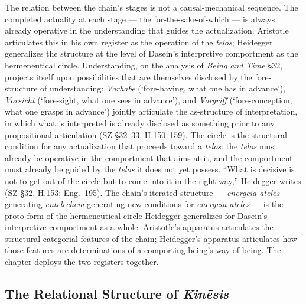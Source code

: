 The relation between the chain's stages is not a causal-mechanical sequence. The completed actuality at each stage --- the for-the-sake-of-which --- is always already operative in the understanding that guides the actualization. Aristotle articulates this in his own register as the operation of the \textit{telos}; Heidegger generalizes the structure at the level of Dasein's interpretive comportment as the hermeneutical circle. Understanding, on the analysis of \textit{Being and Time} \S 32, projects itself upon possibilities that are themselves disclosed by the fore-structure of understanding: \textit{Vorhabe} (`fore-having, what one has in advance'), \textit{Vorsicht} (`fore-sight, what one sees in advance'), and \textit{Vorgriff} (`fore-conception, what one grasps in advance') jointly articulate the as-structure of interpretation, in which what is interpreted is already disclosed as something prior to any propositional articulation (SZ \S 32--33, H.150--159). The circle is the structural condition for any actualization that proceeds toward a \textit{telos}: the \textit{telos} must already be operative in the comportment that aims at it, and the comportment must already be guided by the \textit{telos} it does not yet possess. ``What is decisive is not to get out of the circle but to come into it in the right way,'' Heidegger writes (SZ \S 32, H.153; Eng.~195). The chain's iterated structure --- \textit{energeia ateles} generating \textit{entelecheia} generating new conditions for \textit{energeia ateles} --- is the proto-form of the hermeneutical circle Heidegger generalizes for Dasein's interpretive comportment as a whole. Aristotle's apparatus articulates the structural-categorial features of the chain; Heidegger's apparatus articulates how those features are determinations of a comporting being's way of being. The chapter deploys the two registers together.

\subsection{The Relational Structure of \textit{Kinēsis}}

